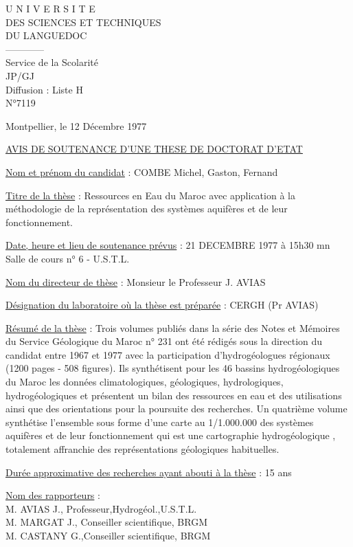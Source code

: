 \begin{center}
U N I V E R S I T E\\
DES SCIENCES ET TECHNIQUES\\
DU LANGUEDOC\\
------------\\
Service de la Scolarité\\
JP/GJ\\
Diffusion : Liste H\\
N°7119
\end{center}
Montpellier, le 12 Décembre 1977

\uline{AVIS DE SOUTENANCE D'UNE THESE DE DOCTORAT D'ETAT}

\uline{Nom et prénom du candidat} : COMBE Michel, Gaston, Fernand

\uline{Titre de la thèse} : Ressources en Eau du Maroc avec application à la méthodologie de la représentation des systèmes aquifères et de leur fonctionnement.

\uline{Date, heure et lieu de soutenance prévus} : 21 DECEMBRE 1977 à 15h30 mn\\
Salle de cours n° 6 - U.S.T.L.

\uline{Nom du directeur de thèse} : Monsieur le Professeur J. AVIAS

\uline{Désignation du laboratoire où la thèse est préparée} : CERGH (Pr AVIAS)

\uline{Résumé de la thèse} : Trois volumes publiés dans la série des Notes et Mémoires du Service Géologique du Maroc n° 231 ont été rédigés sous la direction du candidat entre 1967 et 1977 avec la participation d'hydrogéologues régionaux (1200 pages - 508 figures). Ils synthétisent pour les 46 bassins hydrogéologiques du Maroc les données climatologiques, géologiques, hydrologiques, hydrogéologiques et présentent un bilan des ressources en eau et des utilisations ainsi que des orientations pour la poursuite des recherches. Un quatrième volume synthétise l'ensemble sous forme d'une carte au 1/1.000.000 des systèmes aquifères et de leur fonctionnement qui est une cartographie hydrogéologique , totalement affranchie des représentations géologiques habituelles.

\uline{Durée approximative des recherches ayant abouti à la thèse} : 15 ans

\uline{Nom des rapporteurs} :\\
M. AVIAS J., Professeur,Hydrogéol.,U.S.T.L.\\
M. MARGAT J., Conseiller scientifique, BRGM\\
M. CASTANY G.,Conseiller scientifique, BRGM

